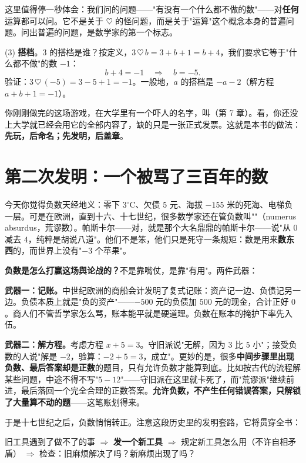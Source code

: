 这里值得停一秒体会：我们问的问题——"有没有一个什么都不做的数"——对\textbf{任何}运算都可以问。它不是关于 $\heartsuit$ 的怪问题，而是关于"运算"这个概念本身的普遍问题。问出普遍的问题，是数学家的第一个标志。

(3) \textbf{搭档}。$3$ 的搭档是谁？按定义，$3 \,\heartsuit\, b = 3 + b + 1 = b+4$，我们要求它等于"什么都不做"的数 $-1$：
\[
b + 4 = -1 \quad\Longrightarrow\quad b = -5 .
\]
验证：$3\,\heartsuit\,(-5) = 3 - 5 + 1 = -1$。\checkmark 一般地，$a$ 的搭档是 $-a-2$（解方程 $a + b + 1 = -1$）。

你刚刚做完的这场游戏，在大学里有一个吓人的名字，叫（第 7 章）。看，你还没上大学就已经会用它的全部内容了，缺的只是一张正式发票。这就是本书的做法：\textbf{先玩，后命名；先发明，后盖章}。

\section{第二次发明：一个被骂了三百年的数}

今天你觉得负数天经地义：零下 $3^\circ$C、欠债 $5$ 元、海拔 $-155$ 米的死海、电梯负一层。可是在欧洲，直到十六、十七世纪，很多数学家还在管负数叫""（numerus absurdus，荒谬数）。帕斯卡尔——对，就是那个大名鼎鼎的帕斯卡尔——说"从 $0$ 减去 $4$，纯粹是胡说八道"。他们不是笨，他们只是死守一条规矩：数是用来\textbf{数东西}的，而世界上没有"$-3$ 个苹果"。

\textbf{负数是怎么打赢这场舆论战的？}不是靠嘴仗，是靠"有用"。两件武器：

\textbf{武器一：记账。}中世纪欧洲的商船会计发明了复式记账：资产记一边、负债记另一边。负债本质上就是"负的资产"——$-500$ 元的负债加 $500$ 元的现金，合计正好 $0$。商人们不管哲学家怎么骂，账本能平就是硬道理。负数在账本的掩护下率先入伍。

\textbf{武器二：解方程。}考虑方程 $x + 5 = 3$。守旧派说"无解，因为 $3$ 比 $5$ 小"；接受负数的人说"解是 $-2$，验算：$-2 + 5 = 3$，成立"。更妙的是，很多\textbf{中间步骤里出现负数、最后答案却是正数}的题目，只有允许负数才能算到底。比如按古代的流程解某些问题，中途不得不写"$5 - 12$"——守旧派在这里就卡死了，而"荒谬派"继续前进，最后落回一个完全合理的正数答案。\textbf{允许负数，不产生任何错误答案，只解锁了大量算不动的题}——这笔账划得来。

于是十七世纪之后，负数悄悄转正。注意这段历史里的发明套路，它将贯穿全书：
\begin{jielun}
旧工具遇到了做不了的事 $\Longrightarrow$ \textbf{发一个新工具} $\Longrightarrow$ 规定新工具怎么用（不许自相矛盾） $\Longrightarrow$ 检查：旧麻烦解决了吗？新麻烦出现了吗？
\end{jielun}

